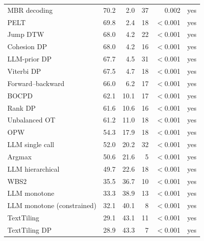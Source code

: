 \begin{table}[t]
\begin{tabular*}{\linewidth}{@{\extracolsep{\fill}}lrrrrr@{}}
MBR decoding & 70.2 & 2.0 & 37 & 0.002 & yes \\
PELT & 69.8 & 2.4 & 18 & $<$0.001 & yes \\
Jump DTW & 68.0 & 4.2 & 22 & $<$0.001 & yes \\
Cohesion DP & 68.0 & 4.2 & 16 & $<$0.001 & yes \\
LLM-prior DP & 67.7 & 4.5 & 31 & $<$0.001 & yes \\
Viterbi DP & 67.5 & 4.7 & 18 & $<$0.001 & yes \\
Forward--backward & 66.0 & 6.2 & 17 & $<$0.001 & yes \\
BOCPD & 62.1 & 10.1 & 17 & $<$0.001 & yes \\
Rank DP & 61.6 & 10.6 & 16 & $<$0.001 & yes \\
Unbalanced OT & 61.2 & 11.0 & 18 & $<$0.001 & yes \\
OPW & 54.3 & 17.9 & 18 & $<$0.001 & yes \\
LLM single call & 52.0 & 20.2 & 32 & $<$0.001 & yes \\
Argmax & 50.6 & 21.6 & 5 & $<$0.001 & yes \\
LLM hierarchical & 49.7 & 22.6 & 18 & $<$0.001 & yes \\
WBS2 & 35.5 & 36.7 & 10 & $<$0.001 & yes \\
LLM monotone & 33.3 & 38.9 & 13 & $<$0.001 & yes \\
LLM monotone (constrained) & 32.1 & 40.1 & 8 & $<$0.001 & yes \\
TextTiling & 29.1 & 43.1 & 11 & $<$0.001 & yes \\
TextTiling DP & 28.9 & 43.3 & 7 & $<$0.001 & yes \\
\bottomrule
\end{tabular*}
\end{table}
